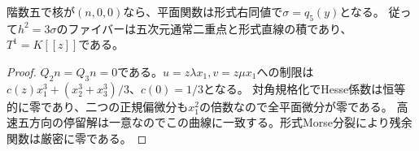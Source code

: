 \begin{proposition}[一ブロック核の非孤立極限]\label{mh:nonisolated}
階数五で核が$(n,0,0)$なら、平面関数は形式右同値で$\sigma=q_5(y)$となる。
従って$h^2=3\sigma$のファイバーは五次元通常二重点と形式直線の積であり、
$T^1=K[[z]]$である。
\end{proposition}
\begin{proof}
$Q_2n=Q_3n=0$である。$u=z\lambda x_1,v=z\mu x_1$への制限は
$c(z)x_1^3+(x_2^3+x_3^3)/3$、$c(0)=1/3$となる。
対角規格化でHesse係数は恒等的に零であり、二つの正規偏微分も$x_1^2$の倍数なので全平面微分が零である。
高速五方向の停留解は一意なのでこの曲線に一致する。形式Morse分裂により残余関数は厳密に零である。
\end{proof}
